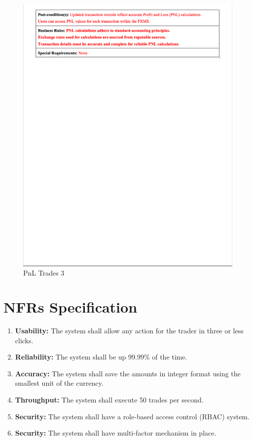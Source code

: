 \documentclass[a4paper]{report}
\begin{document}
\begin{figure}[h!]
    \centering
    \includegraphics[width=\textwidth]{images/uc/10.3-pnl-trades.png}
    \caption{PnL Trades 3}
    \label{fig:10.3-pnl-trades}
\end{figure}

\chapter{NFRs Specification}

\begin{enumerate}
    \item \textbf{Usability:} The system shall allow any action for the trader in three or less clicks.
    \item \textbf{Reliability:} The system shall be up 99.99\% of the time.
    \item \textbf{Accuracy:} The system shall save the amounts in integer format using the smallest unit of the currency.
    \item \textbf{Throughput:} The system shall execute 50 trades per second.
    \item \textbf{Security:} The system shall have a role-based access control (RBAC) system.
    \item \textbf{Security:} The system shall have multi-factor mechanism in place.
\end{enumerate}
\end{document}
